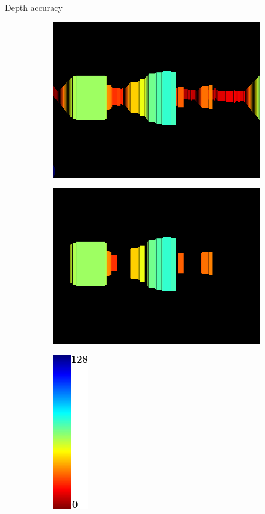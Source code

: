 \begin{frame}[plain]{Depth accuracy}
\begin{center}
\begin{figure}
\begin{subfigure}[b]{0.3\textwidth}
	      \includegraphics[height=0.3\figuresheight]{stixels}
	  \end{subfigure}%
	  \begin{subfigure}[b]{0.3\textwidth}
	      \includegraphics[height=0.3\figuresheight]{objects}
	  \end{subfigure}%
	  \begin{subfigure}[b]{0.1\textwidth}
	      \includegraphics[height=0.3\figuresheight]{colorscale_jet}
	  \end{subfigure}%
    \end{figure}
  \end{center}
\end{frame}

